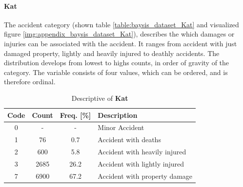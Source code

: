 \paragraph{Kat}
The accident category (shown table \autoref{table:baysis_dataset_Kat} and visualized figure \autoref{img:appendix_baysis_dataset_Kat}), describes the which damages or injuries can be associated with the accident. It ranges from accident with just  damaged property, lightly and heavily injured to deathly accidents. The distribution develops from lowest to highs counts, in order of gravity of the category. The variable consists of four values, which can be ordered, and is therefore ordinal.
\begin{table}[!ht]
	\centering
	\small
	\begin{tabular}{c|c|c|l} 
		\toprule
		Code & Count & Freq. [\%] & Description \\ 
		\midrule
 		0 	& - 	& 	-	& Minor Accident  \\
 		1 	& 76 	& 0.7 	& Accident with deaths  \\ 
 		2 	& 600	& 5.8	& Accident with heavily injured  \\
 		3 	& 2685	& 26.2	& Accident with lightly injured  \\
		7 	& 6900	& 67.2	& Accident with property damage  \\
		\bottomrule
	\end{tabular}
	\caption{Descriptive of \textbf{Kat}}
	\label{table:baysis_dataset_Kat}
	\vspace{-8mm}
\end{table}


